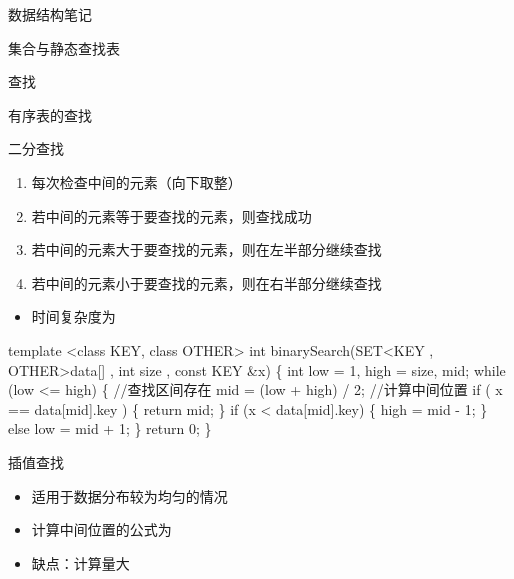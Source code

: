 \documentclass[
  ignorenonframetext,
]{beamer}
\newenvironment{Shaded}{}{}
\newcommand{\NormalTok}[1]{#1}
\providecommand{\tightlist}{%
  \setlength{\itemsep}{0pt}\setlength{\parskip}{0pt}}
\begin{document}
\begin{frame}[fragile]{数据结构笔记}
\begin{block}{集合与静态查找表}
\begin{block}{查找}
\begin{block}{有序表的查找}
\begin{block}{二分查找}
\protect{}\label{ux4e8cux5206ux67e5ux627e}
\begin{enumerate}
\tightlist
\item
  每次检查中间的元素（向下取整）
\item
  若中间的元素等于要查找的元素，则查找成功
\item
  若中间的元素大于要查找的元素，则在左半部分继续查找
\item
  若中间的元素小于要查找的元素，则在右半部分继续查找
\end{enumerate}

\begin{itemize}
\tightlist
\item
  时间复杂度为 {}
\end{itemize}

\begin{Shaded}
\begin{Highlighting}[]
\NormalTok{template \textless{}class KEY, class OTHER\textgreater{}}
\NormalTok{int binarySearch(SET\textless{}KEY , OTHER\textgreater{}data[] , int size , const KEY \&x) }
\NormalTok{\{}
\NormalTok{  int low = 1,  high = size, mid;}
\NormalTok{    while (low \textless{}= high)}
\NormalTok{    \{                 //查找区间存在}
\NormalTok{      mid = (low + high) / 2;         //计算中间位置}
\NormalTok{      if ( x == data[mid].key ) }
\NormalTok{      \{}
\NormalTok{        return mid;}
\NormalTok{      \}}
\NormalTok{      if (x \textless{} data[mid].key)}
\NormalTok{      \{}
\NormalTok{        high = mid {-} 1;}
\NormalTok{      \}}
\NormalTok{      else low = mid + 1;}
\NormalTok{    \}   }
\NormalTok{  return 0;}
\NormalTok{\}}
\end{Highlighting}
\end{Shaded}
\end{block}

\begin{block}{插值查找}
\protect{}\label{ux63d2ux503cux67e5ux627e}
\begin{itemize}
\tightlist
\item
  适用于数据分布较为均匀的情况
\item
  计算中间位置的公式为
\end{itemize}

\begin{itemize}
\tightlist
\item
  缺点：计算量大
\end{itemize}
\end{block}


\end{block}
\end{block}
\end{block}
\end{frame}
\end{document}
